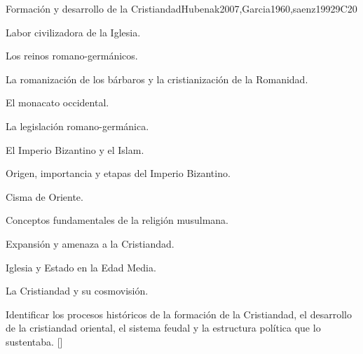 \begin{syllabus}
\begin{unit}{}{Formación y desarrollo de la Cristiandad}{Hubenak2007,Garcia1960,saenz1992}{9}{C20}
\begin{topics}
	\item Labor civilizadora de la Iglesia.
	    \begin{subtopics}
		\item Los reinos romano-germánicos.
		\item La romanización de los bárbaros y la cristianización de la Romanidad.
		\item El monacato occidental.
		\item La legislación romano-germánica.
	    \end{subtopics}
	\item El Imperio Bizantino y el Islam.
	    \begin{subtopics}
		\item Origen, importancia y etapas del Imperio Bizantino.
		\item Cisma de Oriente.
		\item Conceptos fundamentales de la religión musulmana.
		\item Expansión y amenaza a la Cristiandad.
	    \end{subtopics}
	\item Iglesia y Estado en la Edad Media.
	\item La Cristiandad y su cosmovisión.
\end{topics}
\begin{learningoutcomes}
	\item Identificar los procesos históricos de la formación de la Cristiandad, el desarrollo de la cristiandad oriental, el sistema feudal y la estructura política que lo sustentaba. [\Familiarity]
\end{learningoutcomes}
\end{unit}


\end{syllabus}
